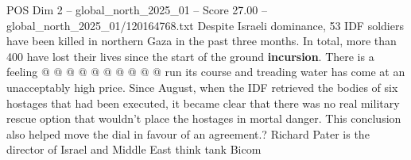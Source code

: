 \begin{textsample}{POS Dim 2 – global\_north\_2025\_01 – Score 27.00 – global\_north\_2025\_01/120164768.txt}
Despite Israeli dominance, 53 IDF soldiers have been killed in northern Gaza in the past three months.
In total, more than 400 have lost their lives since the start of the ground \textbf{incursion}.
There is a feeling @ @ @ @ @ @ @ @ @ @ run its course and treading water has come at an unacceptably high price.
Since August, when the IDF retrieved the bodies of six hostages that had been executed, it became clear that there was no real military rescue option that wouldn't place the hostages in mortal danger.
This conclusion also helped move the dial in favour of an agreement.?
Richard Pater is the director of Israel and Middle East think tank Bicom

\end{textsample}
